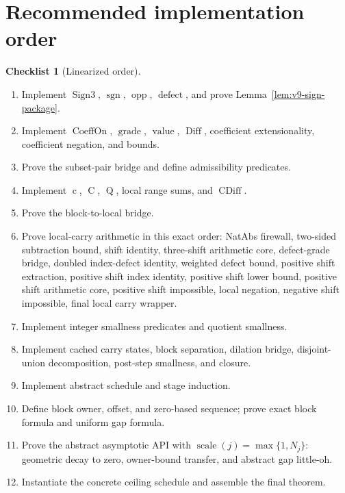 \documentclass[11pt]{article}
\theoremstyle{definition}
\newtheorem{checklist}[definition]{Checklist}
\theoremstyle{plain}
\theoremstyle{remark}
\newcommand{\Sgn}{\operatorname{Sign3}}
\newcommand{\sgn}{\operatorname{sgn}}
\newcommand{\opp}{\operatorname{opp}}
\newcommand{\defect}{\operatorname{defect}}
\newcommand{\CoeffOn}{\operatorname{CoeffOn}}
\newcommand{\Grade}{\operatorname{grade}}
\newcommand{\Val}{\operatorname{value}}
\newcommand{\Diff}{\operatorname{Diff}}
\newcommand{\celt}{\operatorname{c}}
\newcommand{\Cblock}{\operatorname{C}}
\newcommand{\Qfun}{\operatorname{Q}}
\newcommand{\CDiff}{\operatorname{CDiff}}
\newcommand{\Scale}{\operatorname{scale}}
\begin{document}
\section{Recommended implementation order}

\begin{checklist}[Linearized order]
\begin{enumerate}[label=(\arabic*), leftmargin=*]
\item Implement \(\Sgn\), \(\sgn\), \(\opp\), \(\defect\), and prove Lemma~\ref{lem:v9-sign-package}.
\item Implement \(\CoeffOn\), \(\Grade\), \(\Val\), \(\Diff\), coefficient extensionality, coefficient negation, and bounds.
\item Prove the subset-pair bridge and define admissibility predicates.
\item Implement \(\celt\), \(\Cblock\), \(\Qfun\), local range sums, and \(\CDiff\).
\item Prove the block-to-local bridge.
\item Prove local-carry arithmetic in this exact order: NatAbs firewall, two-sided subtraction bound, shift identity, three-shift arithmetic core, defect-grade bridge, doubled index-defect identity, weighted defect bound, positive shift extraction, positive shift index identity, positive shift lower bound, positive shift arithmetic core, positive shift impossible, local negation, negative shift impossible, final local carry wrapper.
\item Implement integer smallness predicates and quotient smallness.
\item Implement cached carry states, block separation, dilation bridge, disjoint-union decomposition, post-step smallness, and closure.
\item Implement abstract schedule and stage induction.
\item Define block owner, offset, and zero-based sequence; prove exact block formula and uniform gap formula.
\item Prove the abstract asymptotic API with \(\Scale(j)=\max\{1,N_j\}\): geometric decay to zero, owner-bound transfer, and abstract gap little-oh.
\item Instantiate the concrete ceiling schedule and assemble the final theorem.
\end{enumerate}
\end{checklist}
\end{document}
